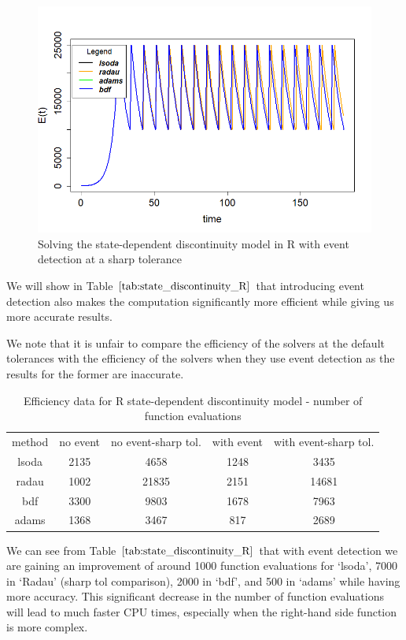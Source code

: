 \begin{figure}[H]
\centering
\includegraphics[width=0.7\linewidth]{./figures/solve_state_discontinuity_sharp_R}
\caption{Solving the state-dependent discontinuity model in R with event detection at a sharp tolerance}
\label{fig:solve_state_discontinuity_sharp_R}
\end{figure}

We will show in Table $\ref{tab:state_discontinuity_R}$ that introducing event detection also makes the computation significantly more efficient while giving us more accurate results.

We note that it is unfair to compare the efficiency of the solvers at the default tolerances with the efficiency of the solvers when they use event detection as the results for the former are inaccurate.

\begin{table}[h]
\caption {Efficiency data for R state-dependent discontinuity model - number of function evaluations} 
\label{tab:state_discontinuity_R}
\begin{center}
\begin{tabular}{ c c c c c } 
method & no event & no event-sharp tol. & with event & with event-sharp tol.\\ 
lsoda & 2135 & 4658 & 1248 & 3435 \\
radau & 1002 & 21835 & 2151 & 14681\\
bdf & 3300 & 9803 & 1678 & 7963\\
adams & 1368 & 3467 & 817 & 2689\\
\end{tabular}
\end{center}
\end{table}

We can see from Table $\ref{tab:state_discontinuity_R}$ that with event detection we are gaining an improvement of around 1000 function evaluations for `lsoda', 7000 in `Radau' (sharp tol comparison), 2000 in `bdf', and 500 in `adams' while having more accuracy. This significant decrease in the number of function evaluations will lead to much faster CPU times, especially when the right-hand side function is more complex.

